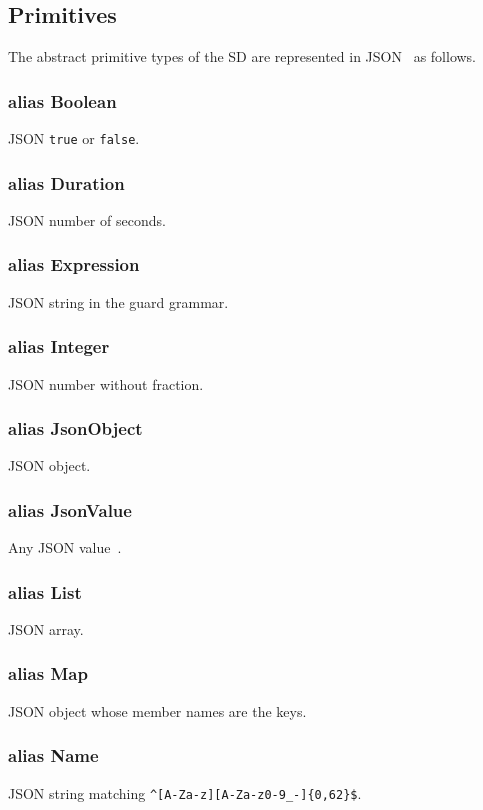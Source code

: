\documentclass[a4paper]{arrowhead}
\newcommand{\pdef}[1]{{\textcolor{ArrowheadGrey}{#1\label{sec:model:primitives:#1}\label{sec:model:primitives:#1s}}}}
\begin{document}
\subsection{Primitives}
\label{sec:model:primitives}
The abstract primitive types of the SD are represented in JSON~\cite{rfc8259} as follows.
\subsubsection*{alias \pdef{Boolean}}
JSON \texttt{true} or \texttt{false}.

\subsubsection*{alias \pdef{Duration}}
JSON number of seconds.

\subsubsection*{alias \pdef{Expression}}
JSON string in the guard grammar.

\subsubsection*{alias \pdef{Integer}}
JSON number without fraction.

\subsubsection*{alias \pdef{JsonObject}}
JSON object.

\subsubsection*{alias \pdef{JsonValue}}
Any JSON value~\cite{rfc8259}.

\subsubsection*{alias \pdef{List}}
JSON array.

\subsubsection*{alias \pdef{Map}}
JSON object whose member names are the keys.

\subsubsection*{alias \pdef{Name}}
JSON string matching \texttt{\^{}[A-Za-z][A-Za-z0-9\_-]\{0,62\}\$}.
\end{document}
